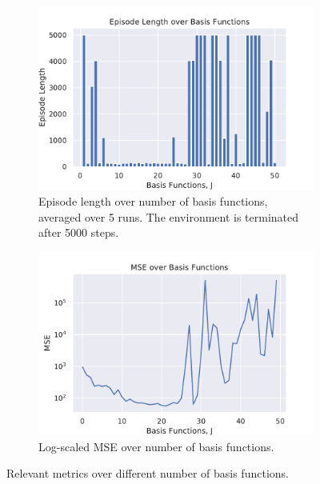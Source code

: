 \documentclass{article}
\begin{document}
\begin{figure}
    \centering
    \begin{subfigure}{.49\linewidth}
        \centering
        \includegraphics[width=\linewidth]{Figures/ep_steps_j.pdf}
        \caption{Episode length over number of basis functions, averaged over 5 runs. The environment is terminated after 5000 steps.}
        \label{fig:ep-steps-j}
    \end{subfigure}
    \begin{subfigure}{.49\linewidth}
        \centering
        \includegraphics[width=\linewidth]{Figures/mse_j.pdf}
        \caption{Log-scaled MSE over number of basis functions.}
        \label{fig:mse-j}
    \end{subfigure}
    \caption{Relevant metrics over different number of basis functions.}
    \label{fig:metrics-rbf}
\end{figure}
\end{document}
